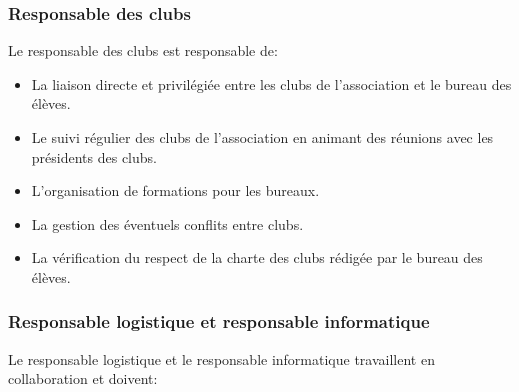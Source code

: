 \documentclass{article} %
\begin{document}
			\subsubsection{Responsable des clubs}
\label{ssub:responsable_des_clubs}

				Le responsable des clubs est responsable de:
				\begin{itemize}
					\item La liaison directe et privilégiée entre les clubs de
						l’association et le bureau des élèves.
					\item Le suivi régulier des clubs de l’association en
						animant des réunions avec les
						présidents des clubs.
					\item L’organisation de formations pour les bureaux.
					\item La gestion des éventuels conflits entre clubs.
					\item La vérification du respect de la charte des clubs
						rédigée par le bureau des élèves.
				\end{itemize}

			\subsubsection{Responsable logistique et responsable informatique}
\label{ssub:responsable_logistique_et_responsable_informatique}

				Le responsable logistique et le responsable informatique 
				travaillent en collaboration et doivent:
				
\end{document}
